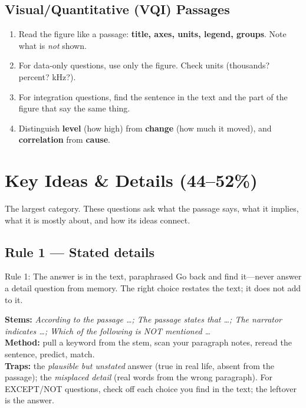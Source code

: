 \documentclass[11pt]{article}
\begin{document}
\subsection{Visual/Quantitative (VQI) Passages}
\begin{enumerate}
  \item Read the figure like a passage: \textbf{title, axes, units, legend, groups}. Note what is \emph{not} shown.
  \item For data-only questions, use only the figure. Check units (thousands? percent? kHz?).
  \item For integration questions, find the sentence in the text and the part of the figure that say the same thing.
  \item Distinguish \textbf{level} (how high) from \textbf{change} (how much it moved), and \textbf{correlation} from \textbf{cause}.
\end{enumerate}

\section{Key Ideas \& Details (44--52\%)}
The largest category. These questions ask what the passage says, what it implies, what it is mostly about, and how its ideas connect.

\subsection{Rule 1 --- Stated details}
\begin{rulebox}{Rule 1: The answer is in the text, paraphrased}
Go back and find it---never answer a detail question from memory. The right choice restates the text; it does not add to it.
\end{rulebox}
\textbf{Stems:} \emph{According to the passage \dots; The passage states that \dots; The narrator indicates \dots; Which of the following is NOT mentioned \dots}\\
\textbf{Method:} pull a keyword from the stem, scan your paragraph notes, reread the sentence, predict, match.\\
\textbf{Traps:} the \emph{plausible but unstated} answer (true in real life, absent from the passage); the \emph{misplaced detail} (real words from the wrong paragraph). For EXCEPT/NOT questions, check off each choice you find in the text; the leftover is the answer.
\end{document}
